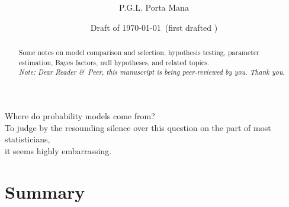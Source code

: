 \documentclass[\ifafour a4paper,12pt,\else a5paper,10pt,\fi%
onecolumn,oneside,article,%
british%
]{memoir}
\title{\propertitle%
}
\author{%
\hspace*{\stretch{1}}%
\parbox{0.5\linewidth}%
{\protect\centering P.G.L.  Porta Mana\\%
\footnotesize\epost{\email{piero.mana}{ntnu.no}}}%
\hspace*{\stretch{1}}%
}
\date{Draft of \today\ (first drafted \firstdraft)}
\theoremstyle{remark}
\theoremstyle{innote}
\newcommand*{\citep}{\parencites}
\newcommand*{\amp}{\&}
\newcommand*{\asudedication}[1]{%
{\par\centering\textit{#1}\par}}
\renewcommand*{\|}{\nonscript\,\vert\nonscript\;\mathopen{}}
\begin{document}
\captiondelim{\quad}\captionnamefont{\footnotesize}\captiontitlefont{\footnotesize}
\frenchspacing

\maketitle
\abstractrunin
\abslabeldelim{}
\renewcommand*{\abstractname}{}
\setlength{\absleftindent}{0pt}
\setlength{\absrightindent}{0pt}
\setlength{\abstitleskip}{-\absparindent}
\begin{abstract}%
  \noindent Some notes on model comparison and selection, hypothesis
  testing, parameter estimation, Bayes factors, null hypotheses, and
  related topics.
  \\\noindent\emph{\footnotesize Note: Dear Reader \amp\ Peer, this
    manuscript is being peer-reviewed by you. Thank you.}
\end{abstract}

\frenchspacing


 \setlength{\epigraphwidth}{.5\columnwidth}
 \epigraphfontsize{\footnotesize}
 \setlength{\epigraphrule}{0pt}
 \epigraph{Where do probability models come from?\\ To judge by the resounding
  silence over this question on the part of most statisticians,\\ it seems
  highly embarrassing.}{\citep[p.~220]{dawid1982}}


\section{Summary}
\label{sec:summary}
\end{document}
